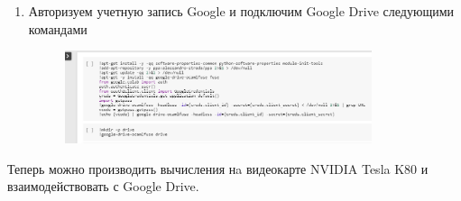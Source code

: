 \begin{enumerate}
\item Авторизуем учетную запись Google и подключим Google Drive следующими командами
\begin{figure}[h]
    \centering
    \includegraphics[width=0.85\textwidth]{colab_settings_4.png}
    \label{fig:colab_settings_4}
\end{figure}

\end{enumerate}

Теперь можно производить вычисления нa видеокарте NVIDIA Tesla K80 и взаимодействовать с Google Drive.

\newpage 